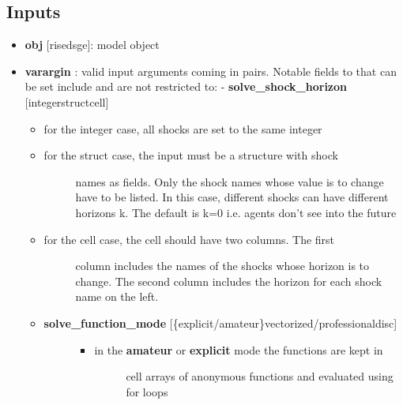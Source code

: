 \documentclass[letterpaper,10pt,english]{sphinxmanual}
\begin{document}
\subsection{Inputs}
\label{classes/models/@dsge/dsge:id180}\begin{itemize}
\item {} 
\textbf{obj} {[}rise\textbar{}dsge{]}: model object

\item {} 
\textbf{varargin} : valid input arguments coming in pairs. Notable fields to
that can be set include and are not restricted to:
- \textbf{solve\_shock\_horizon} {[}integer\textbar{}struct\textbar{}cell{]}
\begin{itemize}
\item {} 
for the integer case, all shocks are set to the same integer

\item {} \begin{description}
\item[{for the struct case, the input must be a structure with shock}] \leavevmode
names as fields. Only the shock names whose value is to change
have to be listed. In this case, different shocks can have
different horizons k. The default is k=0 i.e. agents don't
see into the future

\end{description}

\item {} \begin{description}
\item[{for the cell case, the cell should have two columns. The first}] \leavevmode
column includes the names of the shocks whose horizon is to
change. The second column includes the horizon for each shock
name on the left.

\end{description}

\end{itemize}
\begin{itemize}
\item {} \begin{description}
\item[{\textbf{solve\_function\_mode} {[}\{explicit/amateur\}\textbar{}vectorized/professional\textbar{}disc{]}}] \leavevmode\begin{itemize}
\item {} \begin{description}
\item[{in the \textbf{amateur} or \textbf{explicit} mode the functions are kept in}] \leavevmode
cell arrays of anonymous functions and evaluated using for
loops


\end{description}
\end{itemize}
\end{description}
\end{itemize}
\end{itemize}
\end{document}
